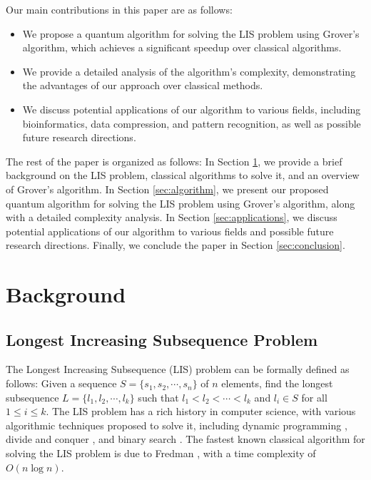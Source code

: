 Our main contributions in this paper are as follows:

\begin{itemize}
    \item We propose a quantum algorithm for solving the LIS problem using Grover's algorithm, which achieves a significant speedup over classical algorithms.
    \item We provide a detailed analysis of the algorithm's complexity, demonstrating the advantages of our approach over classical methods.
    \item We discuss potential applications of our algorithm to various fields, including bioinformatics, data compression, and pattern recognition, as well as possible future research directions.
\end{itemize}

The rest of the paper is organized as follows: In Section \ref{sec:background}, we provide a brief background on the LIS problem, classical algorithms to solve it, and an overview of Grover's algorithm. In Section \ref{sec:algorithm}, we present our proposed quantum algorithm for solving the LIS problem using Grover's algorithm, along with a detailed complexity analysis. In Section \ref{sec:applications}, we discuss potential applications of our algorithm to various fields and possible future research directions. Finally, we conclude the paper in Section \ref{sec:conclusion}.

\section{Background}
\label{sec:background}

\subsection{Longest Increasing Subsequence Problem}

The Longest Increasing Subsequence (LIS) problem can be formally defined as follows: Given a sequence $S = \{s_1, s_2, \cdots, s_n\}$ of $n$ elements, find the longest subsequence $L = \{l_1, l_2, \cdots, l_k\}$ such that $l_1 < l_2 < \cdots < l_k$ and $l_i \in S$ for all $1 \leq i \leq k$. The LIS problem has a rich history in computer science, with various algorithmic techniques proposed to solve it, including dynamic programming \cite{dynamic_programming}, divide and conquer \cite{divide_conquer}, and binary search \cite{binary_search}. The fastest known classical algorithm for solving the LIS problem is due to Fredman \cite{fredman}, with a time complexity of $O(n \log n)$.

